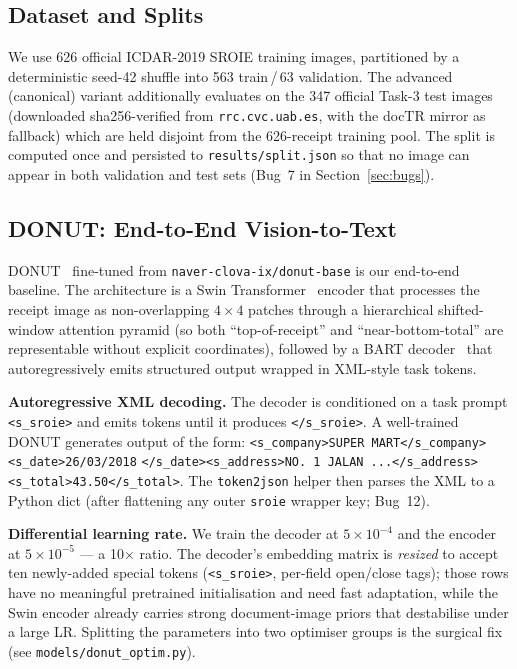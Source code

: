 \documentclass[conference]{IEEEtran}
\newcommand{\IfAdvanced}[1]{#1}
\begin{document}
\subsection{Dataset and Splits}
\label{sec:data_splits}
We use 626 official ICDAR-2019 SROIE training images, partitioned by
a deterministic seed-42 shuffle into
563 train\,/\,63 validation.
\IfAdvanced{The advanced (canonical) variant additionally evaluates
on the 347 official Task-3 test images (downloaded
sha256-verified from \texttt{rrc.cvc.uab.es}, with the docTR mirror
as fallback) which are held disjoint from the 626-receipt training
pool.}  The split is computed
once and persisted to \texttt{results/split.json} so that no image
can appear in both validation and test sets (Bug~7 in
Section~\ref{sec:bugs}).

\subsection{DONUT: End-to-End Vision-to-Text}

DONUT~\cite{kim2022donut} fine-tuned from \texttt{naver-clova-ix/donut-base}
is our end-to-end baseline.  The architecture is a Swin
Transformer~\cite{liu2021swin} encoder that processes the receipt image
as non-overlapping $4{\times}4$ patches through a hierarchical
shifted-window attention pyramid (so both ``top-of-receipt'' and
``near-bottom-total'' are representable without explicit coordinates),
followed by a BART decoder~\cite{lewis2020bart} that
autoregressively emits structured output wrapped in XML-style task tokens.

\textbf{Autoregressive XML decoding.}
The decoder is conditioned on a task prompt
\texttt{<s\_sroie>} and emits tokens until it produces
\texttt{</s\_sroie>}.  A well-trained DONUT generates output of the form:
\texttt{<s\_company>SUPER MART</s\_company><s\_date>26/03/2018}
\texttt{</s\_date><s\_address>NO.~1 JALAN~...</s\_address>}
\texttt{<s\_total>43.50</s\_total>}.
The \texttt{token2json} helper then parses the XML to a Python dict
(after flattening any outer \texttt{sroie} wrapper key; Bug~12).

\textbf{Differential learning rate.}\label{sec:donut_lr}
We train the decoder at $\ensuremath{5\times 10^{-4}}$ and the encoder at
$\ensuremath{5\times 10^{-5}}$ --- a 10$\times$ ratio.  The decoder's embedding
matrix is \emph{resized} to accept ten newly-added special tokens
(\texttt{<s\_sroie>}, per-field open/close tags); those rows have no
meaningful pretrained initialisation and need fast adaptation, while
the Swin encoder already carries strong document-image priors that
destabilise under a large LR.  Splitting the parameters into two
optimiser groups is the surgical fix (see \texttt{models/donut\_optim.py}).
\end{document}
